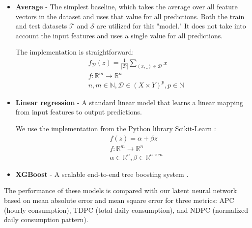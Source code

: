 \begin{itemize}
    \item \textbf{Average} - The simplest baseline, which takes the average over all feature vectors in the dataset and uses that value for all predictions. Both the train and test datasets $\mathcal{T}$ and $\mathcal{S}$ are utilized for this "model." It does not take into account the input features and uses a single value for all predictions.

          The implementation is straightforward:
          \[
              \begin{split}
                   & f_{\mathcal{D}}(z) = \frac{1}{|\mathcal{D}|} \sum_{(x,\_) \in \mathcal{D}} x \\
                   & f: \mathbb{R}^m \rightarrow \mathbb{R}^n                                     \\
                   & n,m \in \mathbb{N}, \mathcal{D} \in (X \times Y)^p, p \in \mathbb{N}
              \end{split}
          \]


    \item \textbf{Linear regression} - A standard linear model that learns a linear mapping from input features to output predictions.

          We use the implementation from the Python library Scikit-Learn :
          \[
              \begin{split}
                   & f(z) = \alpha + \beta z                                    \\
                   & f: \mathbb{R}^m \rightarrow \mathbb{R}^n                   \\
                   & \alpha \in \mathbb{R}^n, \beta \in \mathbb{R}^{n \times m}
              \end{split}
          \]
    \item \textbf{XGBoost} - A scalable end-to-end tree boosting system .
\end{itemize}

The performance of these models is compared with our latent neural network based on mean absolute error and mean square error for three metrics: \acrlong{APC} (hourly consumption), \acrlong{TDPC} (total daily consumption), and \acrlong{NDPC} (normalized daily consumption pattern).
